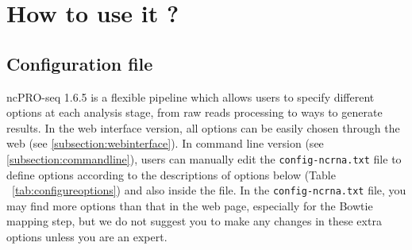 \documentclass[12pt]{article}
\def \ncpip{ncPRO-seq 1.6.5}
\begin{document}
\section{How to use it ?}

\subsection{Configuration file}
\ncpip{} is a flexible pipeline which allows users to specify different options at each analysis stage, from raw reads processing to ways to generate results. In the web interface version, all options can be easily chosen through the web (see \ref{subsection:webinterface}). In command line version (see \ref{subsection:commandline}), users can manually edit the \verb+config-ncrna.txt+ file to define options according to the descriptions of options below (Table ~\ref{tab:configureoptions}) and also inside the file. In the \verb+config-ncrna.txt+ file, you may find more options than that in the web page, especially for the Bowtie mapping step, but we do not suggest you to make any changes in these extra options unless you are an expert.\\\\

\label{subsection:configure}
\end{document}
